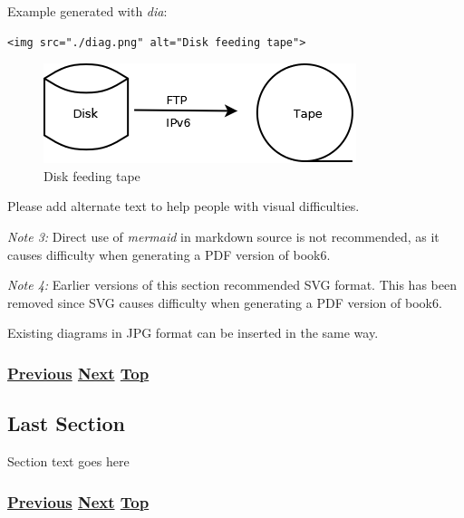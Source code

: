 \documentclass[
]{article}
\begin{document}
Example generated with \emph{dia}:

\begin{verbatim}
<img src="./diag.png" alt="Disk feeding tape">
\end{verbatim}

\begin{figure}
\centering
\includegraphics{diag.png}
\caption{Disk feeding tape}
\end{figure}

Please add alternate text to help people with visual difficulties.

\emph{Note 3:} Direct use of \emph{mermaid} in markdown source is not
recommended, as it causes difficulty when generating a PDF version of
book6.

\emph{Note 4:} Earlier versions of this section recommended SVG format.
This has been removed since SVG causes difficulty when generating a PDF
version of book6.

Existing diagrams in JPG format can be inserted in the same way.

\subsubsection{\texorpdfstring{\hyperref[section-template]{Previous}
\hyperref[last-section]{Next}
\hyperref[chapter-template]{Top}}{Previous Next Top}}\label{previous-next-top-40}

\pagebreak

\subsection{Last Section}\label{last-section}

Section text goes here

\subsubsection{\texorpdfstring{\hyperref[markdown-usage]{Previous}
\hyperref[chapter-template]{Next}
\hyperref[chapter-template]{Top}}{Previous Next Top}}\label{previous-next-top-41}

\pagebreak
\end{document}
